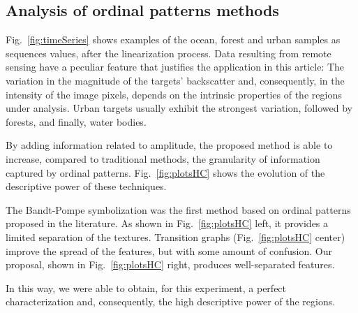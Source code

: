 \documentclass[journal]{IEEEtran}
\begin{document}
\subsection{Analysis of ordinal patterns methods}

Fig.~\ref{fig:timeSeries} shows examples of the ocean, forest and urban samples as sequences values, after the linearization process.
Data resulting from remote sensing have a peculiar feature that justifies the application in this article:
The variation in the magnitude of the targets' backscatter and, consequently, in the intensity of the image pixels, depends on the intrinsic properties of the regions under analysis.
Urban targets usually exhibit the strongest variation, followed by forests, and finally, water bodies.

By adding information related to amplitude, the proposed method is able to increase, compared to traditional methods, the granularity of information captured by ordinal patterns.
Fig.~\ref{fig:plotsHC} shows the evolution of the descriptive power of these techniques.

The Bandt-Pompe symbolization was the first method based on ordinal patterns proposed in the literature.
As shown in Fig.~\ref{fig:plotsHC} left, it provides a limited separation of the textures.
Transition graphs (Fig.~\ref{fig:plotsHC} center) improve the spread of the features, but with some amount of confusion.
Our proposal, shown in Fig.~\ref{fig:plotsHC} right, produces well-separated features.


In this way, we were able to obtain, for this experiment, a perfect characterization and, consequently, the high descriptive power of the regions.
\end{document}
